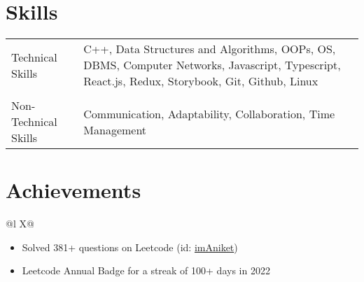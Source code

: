 \documentclass[a4paper,12pt]{article}
\begin{document}
\section{Skills}
\begin{tabularx}{\linewidth}{@{}l X@{}}
Technical Skills &  \normalsize{C++, Data Structures and Algorithms, OOPs, OS, DBMS, Computer Networks, Javascript, Typescript, React.js, Redux, Storybook, Git, Github, Linux}\\
\\
Non-Technical Skills  &  \normalsize{Communication, Adaptability, Collaboration, Time Management}\\  
\end{tabularx}


\section{Achievements}
\begin{tabularx}{\linewidth}{@{}l X@{}}
{
\begin{itemize}
\item Solved 381+ questions on Leetcode (id: \href{https://leetcode.com/imAniket/}{imAniket})
\item Leetcode Annual Badge for a streak of 100+ days in 2022
\end{itemize}
}
\end{tabularx}

\vfill
\end{document}
